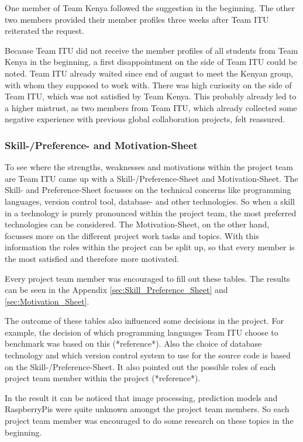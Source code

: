 One member of Team Kenya followed the suggestion in the beginning. The other two members provided their member profiles three weeks after Team ITU reiterated the request.

Because Team ITU did not receive the member profiles of all students from Team Kenya in the beginning, a first disappointment on the side of Team ITU could be noted. Team ITU already waited since end of august to meet the Kenyan group, with whom they supposed to work with. There was high curiosity on the side of Team ITU, which was not satisfied by Team Kenya. This probably already led to a higher mistrust, as two members from Team ITU, which already collected some negative experience with previous global collaboration projects, felt reassured.

\subsubsection {Skill-/Preference- and Motivation-Sheet}
To see where the strengths, weaknesses and motivations within the project team are Team ITU came up with a Skill-/Preference-Sheet and Motivation-Sheet. The Skill- and Preference-Sheet focusses on the technical concerns like programming languages, version control tool, database- and other technologies. So when a skill in a technology is purely pronounced within the project team, the most preferred technologies can be considered. The Motivation-Sheet, on the other hand, focusses more on the different project work tasks and topics. With this information the roles within the project can be split up, so that every member is the most satisfied and therefore more motivated.

Every project team member was encouraged to fill out these tables. The results can be seen in the Appendix \ref{sec:Skill_Preference_Sheet} and \ref{sec:Motivation_Sheet}.

The outcome of these tables also influenced some decisions in the project. For example, the decision of which programming languages Team ITU choose to benchmark was based on this (*reference*). Also the choice of database technology and which version control system to use for the source code is based on the Skill-/Preference-Sheet. It also pointed out the possible roles of each project team member within the project (*reference*).

In the result it can be noticed that image processing, prediction models and RaspberryPis were quite unknown amongst the project team members. So each project team member was encouraged to do some research on these topics in the beginning.

